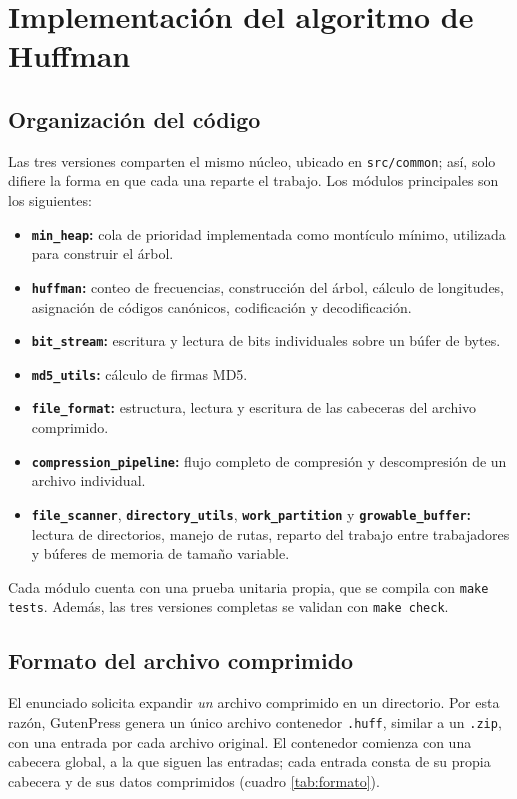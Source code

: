 \documentclass{report}
\begin{document}
\section{Implementación del algoritmo de Huffman}\label{impl-huffman}

\subsection{Organización del código}

Las tres versiones comparten el mismo núcleo, ubicado en \texttt{src/common}; así, solo difiere la forma en que cada una reparte el trabajo. Los módulos principales son los siguientes:

\begin{itemize}
    \item \textbf{\texttt{min\_heap}:} cola de prioridad implementada como montículo mínimo, utilizada para construir el árbol.
    \item \textbf{\texttt{huffman}:} conteo de frecuencias, construcción del árbol, cálculo de longitudes, asignación de códigos canónicos, codificación y decodificación.
    \item \textbf{\texttt{bit\_stream}:} escritura y lectura de bits individuales sobre un búfer de bytes.
    \item \textbf{\texttt{md5\_utils}:} cálculo de firmas MD5.
    \item \textbf{\texttt{file\_format}:} estructura, lectura y escritura de las cabeceras del archivo comprimido.
    \item \textbf{\texttt{compression\_pipeline}:} flujo completo de compresión y descompresión de un archivo individual.
    \item \textbf{\texttt{file\_scanner}}, \textbf{\texttt{directory\_utils}}, \textbf{\texttt{work\_partition}} y \textbf{\texttt{growable\_buffer}:} lectura de directorios, manejo de rutas, reparto del trabajo entre trabajadores y búferes de memoria de tamaño variable.
\end{itemize}

Cada módulo cuenta con una prueba unitaria propia, que se compila con \texttt{make tests}. Además, las tres versiones completas se validan con \texttt{make check}.

\subsection{Formato del archivo comprimido}

El enunciado solicita expandir \emph{un} archivo comprimido en un directorio. Por esta razón, GutenPress genera un único archivo contenedor \texttt{.huff}, similar a un \texttt{.zip}, con una entrada por cada archivo original. El contenedor comienza con una cabecera global, a la que siguen las entradas; cada entrada consta de su propia cabecera y de sus datos comprimidos (cuadro \ref{tab:formato}).
\end{document}
